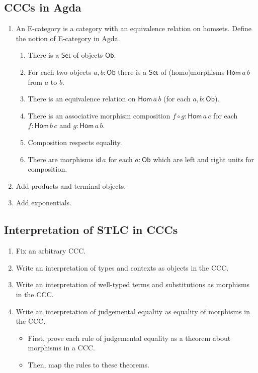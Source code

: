 \documentclass[a4paper,fleqn]{scrartcl}
\newcommand{\Set}{\mathsf{Set}}
\newcommand{\Ob}{\mathsf{Ob}}
\newcommand{\Hom}{\mathsf{Hom}}
\newcommand{\tid}{\mathsf{id}}
\begin{document}
\subsection{CCCs in Agda}
\begin{enumerate}
\item An E-category is a category with an equivalence relation on
  homsets.  Define the notion of E-category in Agda.
  \begin{enumerate}
  \item There is a $\Set$ of objects $\Ob$.
  \item For each two objects $a,b : \Ob$
    there is a $\Set$ of (homo)morphisms $\Hom\,a\,b$ from $a$ to $b$.
  \item There is an equivalence relation on $\Hom\,a\,b$ (for each
    $a,b : \Ob$).
  \item There is an associative morphism composition $f \circ g : \Hom\,a\,c$ for each
    $f : \Hom\,b\,c$ and $g : \Hom\,a\,b$.
  \item Composition respects equality.
  \item There are morphisms $\tid\,a$ for each $a : \Ob$ which are
    left and right units for composition.
  \end{enumerate}
\item Add products and terminal objects.
\item Add exponentials.
\end{enumerate}

\subsection{Interpretation of STLC in CCCs}
\begin{enumerate}
\item Fix an arbitrary CCC.
\item Write an interpretation of types and contexts as objects in the CCC.
\item Write an interpretation of well-typed terms and substitutions as
  morphisms in the CCC.
\item Write an interpretation of judgemental equality as equality of
  morphisms in the CCC.
  \begin{itemize}
  \item First, prove each rule of judgemental equality as a theorem
    about morphisms in a CCC.
  \item Then, map the rules to these theorems.
  \end{itemize}
\end{enumerate}

\clearpage

\printbibliography
\end{document}

